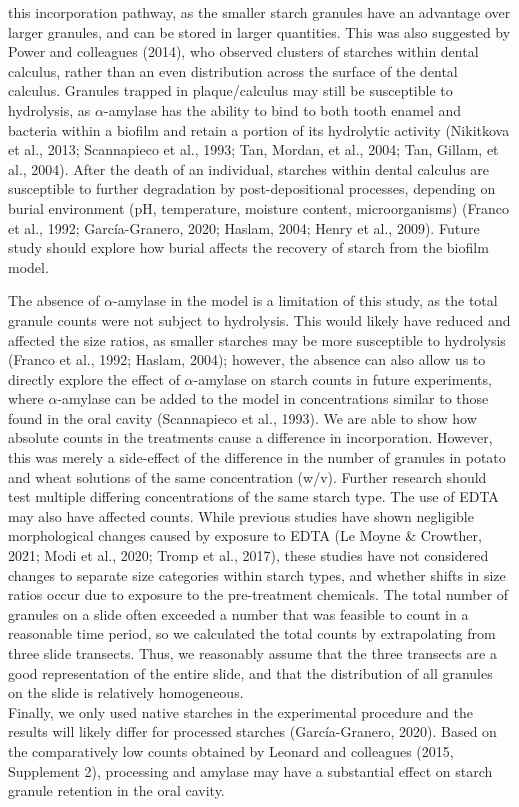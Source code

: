 \documentclass[
]{article}
\begin{document}
this incorporation pathway, as the smaller starch granules have an advantage over
larger granules, and can be stored in larger quantities.
This was also suggested by Power and colleagues (2014), who
observed clusters of starches within dental calculus, rather than an even
distribution across the surface of the dental calculus.
Granules trapped
in plaque/calculus may still be susceptible to hydrolysis, as \(\alpha\)-amylase has
the ability to bind to both tooth enamel and bacteria within a biofilm and retain
a portion of its hydrolytic activity
(Nikitkova et al., 2013; Scannapieco et al., 1993; Tan, Mordan, et al., 2004; Tan, Gillam, et al., 2004).
After the death of an individual, starches within dental calculus are susceptible
to further degradation by post-depositional processes, depending on burial environment
(pH, temperature, moisture content, microorganisms)
(Franco et al., 1992; García-Granero, 2020; Haslam, 2004; Henry et al., 2009).
Future study should explore how burial affects the recovery of starch from the
biofilm model.

The absence of \(\alpha\)-amylase in the model is a limitation of this study, as
the total granule counts were not subject to hydrolysis. This would likely have
reduced and affected the size ratios, as smaller starches may be more
susceptible to hydrolysis
(Franco et al., 1992; Haslam, 2004); however,
the absence can also allow us to directly explore
the effect of \(\alpha\)-amylase on starch counts in future experiments,
where \(\alpha\)-amylase can be added to the model
in concentrations similar to those found in the oral cavity (Scannapieco et al., 1993).
We are able to show how absolute counts in the treatments cause a difference in
incorporation. However, this
was merely a side-effect of the difference in the number of granules in potato and
wheat solutions of the same concentration (w/v). Further research should test
multiple differing concentrations of the same starch type.
The use of EDTA may also have affected counts. While previous studies have shown
negligible morphological changes caused by exposure to EDTA
(Le Moyne \& Crowther, 2021; Modi et al., 2020; Tromp et al., 2017),
these studies have not considered changes to separate size
categories within starch types, and whether shifts in size ratios occur due to
exposure to the pre-treatment chemicals.
The total number of granules on a slide often exceeded a number that
was feasible to count in a reasonable time period, so we calculated the total
counts by extrapolating from three slide transects.
Thus, we reasonably assume that the three transects are a good representation
of the entire slide, and that the distribution of all granules on the slide is
relatively homogeneous.\\
Finally, we only used native starches in the experimental procedure and the results
will likely differ for processed starches (García-Granero, 2020).
Based on the comparatively low counts obtained by Leonard
and colleagues (2015, Supplement 2), processing and amylase
may have a substantial effect on starch granule retention in the oral cavity.
\end{document}
